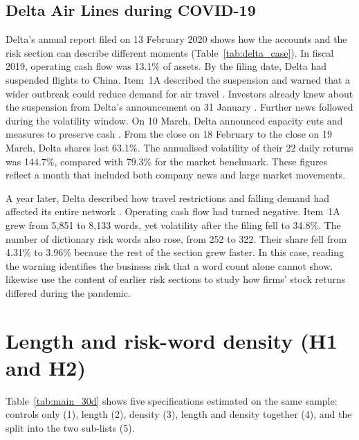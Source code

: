 

\subsection*{Delta Air Lines during COVID-19}
Delta's annual report filed on 13 February 2020 shows how the accounts and the risk section can describe different moments (Table~\ref{tab:delta_case}). In fiscal 2019, operating cash flow was 13.1\% of assets. By the filing date, Delta had suspended flights to China. Item~1A described the suspension and warned that a wider outbreak could reduce demand for air travel \parencite{delta_fy2019}. Investors already knew about the suspension from Delta's announcement on 31 January \parencite{delta_china}. Further news followed during the volatility window. On 10 March, Delta announced capacity cuts and measures to preserve cash \parencite{delta_march}. From the close on 18 February to the close on 19 March, Delta shares lost 63.1\%. The annualised volatility of their 22 daily returns was 144.7\%, compared with 79.3\% for the market benchmark. These figures reflect a month that included both company news and large market movements.



A year later, Delta described how travel restrictions and falling demand had affected its entire network \parencite{delta_fy2020}. Operating cash flow had turned negative. Item~1A grew from 5{,}851 to 8{,}133 words, yet volatility after the filing fell to 34.8\%. The number of dictionary risk words also rose, from 252 to 322. Their share fell from 4.31\% to 3.96\% because the rest of the section grew faster. In this case, reading the warning identifies the business risk that a word count alone cannot show. \textcite{davis2020covid} likewise use the content of earlier risk sections to study how firms' stock returns differed during the pandemic.


\section{Length and risk-word density (H1 and H2)}
\label{sec:joint_results}

Table~\ref{tab:main_30d} shows five specifications estimated on the
same sample: controls only (1), length (2), density (3), length and density
together (4), and the split into the two sub-lists (5).

